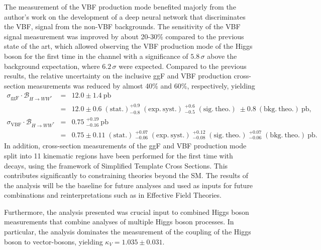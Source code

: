 The measurement of the VBF production mode benefited majorly from the author's work on the development of a deep neural network that discriminates the VBF, \HWW signal from the non-VBF backgrounds. 
The sensitivity of the VBF signal measurement was improved by about 20-30\% compared to the previous state of the art, which allowed observing the VBF production mode of the Higgs boson for the first time in the \HWW channel with a significance of $5.8\,\sigma$ above the background expectation, where $6.2\,\sigma$ were expected.
Compared to the previous \RunTwo results, the relative uncertainty on the inclusive ggF and VBF production cross-section measurements was reduced by almost 40\% and 60\%, respectively, yielding 
\begin{eqnarray*}
    \sigma_{\mathrm{ggF}} \cdot \mathcal{B}_{H \to WW^{\ast}} &=& 12.0 \pm 1.4~\mathrm{pb} \\
    &=& 12.0 \pm 0.6\;(\mathrm{stat.}) ^{+0.9}_{-0.8}\;(\mathrm{exp.~syst.})\;^{+0.6}_{-0.5}\;(\mathrm{sig.~theo.})\; \pm 0.8~(\mathrm{bkg.~theo.})~\mathrm{pb},  \\
    \sigma_{\mathrm{VBF}} \cdot \mathcal{B}_{H \to WW^{\ast}} &=& 0.75\;^{+0.19}_{-0.16}~\mathrm{pb} \\
    &=& 0.75 \pm 0.11\;(\mathrm{stat.})\;^{+0.07}_{-0.06}\;(\mathrm{exp.~syst.})\;^{+0.12}_{-0.08}\;(\mathrm{sig.~theo.})\;^{+0.07}_{-0.06}\;(\mathrm{bkg.~theo.})~\mathrm{pb}.
  \end{eqnarray*}
In addition, cross-section measurements of the ggF and VBF production mode split into 11 kinematic regions have been performed for the first time with \HWW decays, using the framework of Simplified Template Cross Sections. This contributes significantly to constraining theories beyond the SM. 
The results of the \HWW analysis will be the baseline for future analyses and used as inputs for future combinations and reinterpretations such as in Effective Field Theories. 

Furthermore, the analysis presented was crucial input to combined Higgs boson measurements that combine analyses of multiple Higgs boson processes. 
In particular, the \HWW analysis dominates the measurement of the coupling of the Higgs boson to vector-bosons, yielding $\kappa_V = 1.035 \pm 0.031$.

